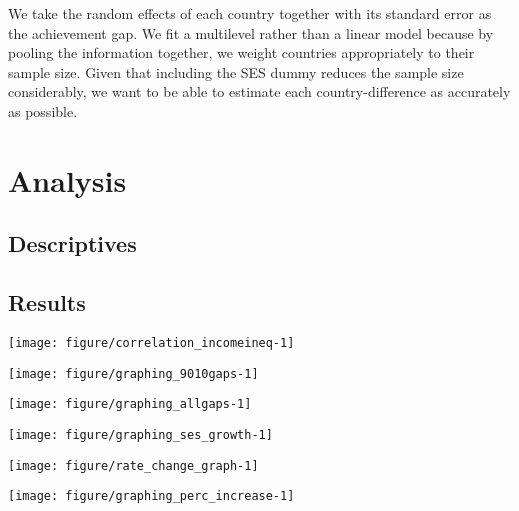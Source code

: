 \documentclass[11pt, a4paper]{article}\usepackage[]{graphicx}\usepackage[]{color}
\begin{document}
We take the random effects of each country together with its standard error as the achievement gap. We fit a multilevel rather than a linear model because by pooling the information together, we weight countries appropriately to their sample size. Given that including the SES dummy reduces the sample size considerably, we want to be able to estimate each country-difference as accurately as possible.


\section{Analysis}

\subsection{Descriptives}





\subsection{Results}



{\centering \texttt{[image: figure/correlation\_incomeineq-1]} 

}






{\centering \texttt{[image: figure/graphing\_9010gaps-1]} 

}






{\centering \texttt{[image: figure/graphing\_allgaps-1]} 

}






{\centering \texttt{[image: figure/graphing\_ses\_growth-1]} 

}










{\centering \texttt{[image: figure/rate\_change\_graph-1]} 

}








{\centering \texttt{[image: figure/graphing\_perc\_increase-1]} 

}









\end{document}
